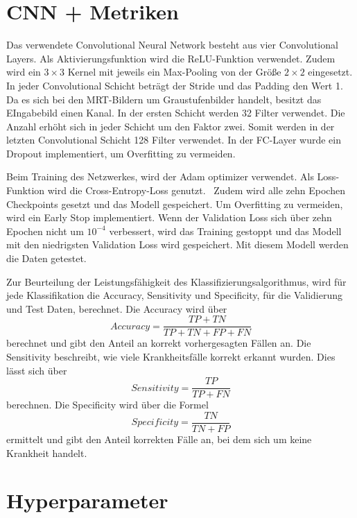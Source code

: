 \section{CNN + Metriken}

Das verwendete Convolutional Neural Network besteht aus vier Convolutional Layers. Als Aktivierungsfunktion wird die ReLU-Funktion verwendet.
Zudem wird ein $3 \times 3$ Kernel mit jeweils ein Max-Pooling von der Größe $2 \times 2$ eingesetzt. 
In jeder Convolutional Schicht beträgt der Stride und das Padding den Wert 1.
Da es sich bei den MRT-Bildern um Graustufenbilder handelt, besitzt das EIngabebild einen Kanal. 
In der ersten Schicht werden 32 Filter verwendet.
Die Anzahl erhöht sich in jeder Schicht um den Faktor zwei.
Somit werden in der letzten Convolutional Schicht 128 Filter verwendet.
In der FC-Layer wurde ein Dropout implementiert, um Overfitting zu vermeiden.

Beim Training des Netzwerkes, wird der Adam optimizer verwendet. 
Als Loss-Funktion wird die Cross-Entropy-Loss genutzt.~\cite{pytorchCrossEntropy}
Zudem wird alle zehn Epochen Checkpoints gesetzt und das Modell gespeichert.
Um Overfitting zu vermeiden, wird ein Early Stop implementiert. Wenn der Validation Loss sich über zehn Epochen nicht um $10^{-4}$
verbessert, wird das Training gestoppt und das Modell mit den niedrigsten Validation Loss wird gespeichert.
Mit diesem Modell werden die Daten getestet.

Zur Beurteilung der Leistungsfähigkeit des Klassifizierungsalgorithmus, wird für jede Klassifikation die Accuracy, 
Sensitivity und Specificity, für die Validierung und Test Daten, berechnet.
Die Accuracy wird über
\begin{equation}
  Accuracy = \frac{TP + TN}{TP + TN + FP + FN}
\end{equation}
berechnet und gibt den Anteil an korrekt vorhergesagten Fällen an. 
Die Sensitivity beschreibt, wie viele Krankheitsfälle korrekt erkannt wurden. Dies lässt sich über
\begin{equation}
  Sensitivity = \frac{TP}{TP + FN}
\end{equation}
berechnen.
Die Specificity wird über die Formel
\begin{equation}
  Specificity = \frac{TN}{TN + FP}
\end{equation}
ermittelt und gibt den Anteil korrekten Fälle an, bei dem sich um keine Krankheit handelt.%

\section{Hyperparameter}\label{sec:Hyperparameter}

